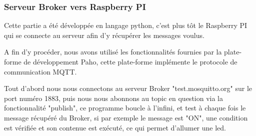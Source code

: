 \documentclass[12pt,a4paper]{article}
\begin{document}
\subsubsection{Serveur Broker vers Raspberry PI}
Cette partie a été développée en langage python, c'est plus tôt le Raspberry PI qui se connecte au serveur afin d'y récupérer les messages voulus.\par
A fin d'y procéder, nous avons utilisé les fonctionnalités fournies par la plate-forme de développement Paho, cette plate-forme implémente le protocole de communication MQTT.\par
Tout d'abord nous nous connectons au serveur Broker "test.mosquitto.org" sur le port numéro 1883, puis nous nous abonnons au topic en question via la fonctionnalité "publish", ce programme boucle à l'infini, et test à chaque fois le message récupéré du Broker, si par exemple le message est "ON", une condition est vérifiée et son contenue est exécuté, ce qui permet d'allumer une led. 
\end{document}
